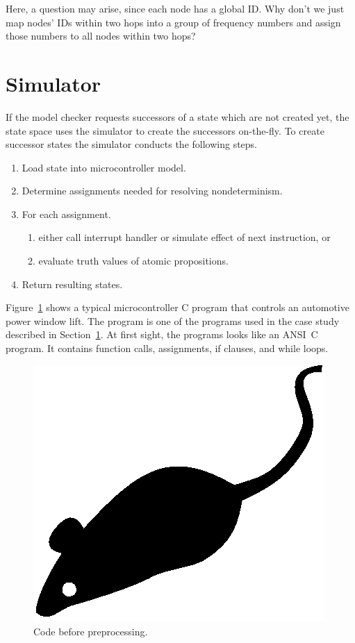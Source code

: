 \documentclass[format=acmsmall, review=false]{acmart}
\begin{document}
Here, a question may arise, since each node has a global ID. Why
don't we just map nodes' IDs within two hops into a group of
frequency numbers and assign those numbers to all nodes within two
hops?

\section{Simulator}
\label{sec:sim}

If the model checker requests successors of a state which are not
created yet, the state space uses the simulator to create the
successors on-the-fly. To create successor states the simulator
conducts the following steps.
\begin{enumerate}
	\item Load state into microcontroller model.
	\item Determine assignments needed for resolving nondeterminism.
	\item For each assignment.
	\begin{enumerate}
		\item either call interrupt handler or simulate effect of next instruction, or
		\item evaluate truth values of atomic propositions.
	\end{enumerate}
	\item Return resulting states.
\end{enumerate}
Figure~\ref{fig:one} shows a typical microcontroller C program that
controls an automotive power window lift. The program is one of the
programs used in the case study described in Section~\ref{sec:sim}.
At first sight, the programs looks like an ANSI~C program. It
contains function calls, assignments, if clauses, and while loops.
\begin{figure}
	\includegraphics{mouse}
	\caption{Code before preprocessing.}
	\label{fig:one}
\end{figure}
\end{document}
